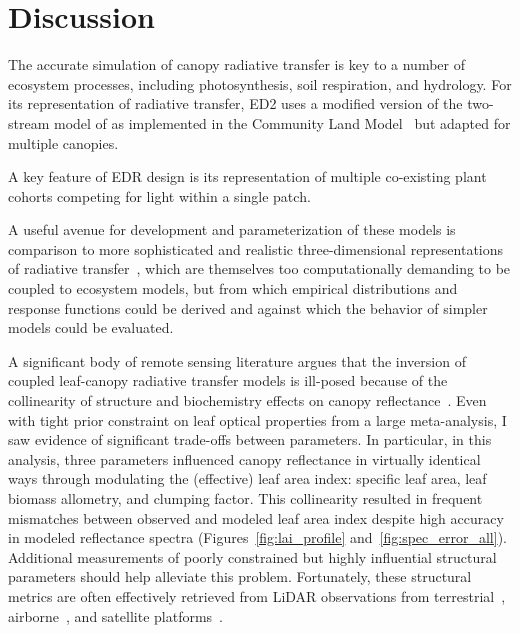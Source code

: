 \section{Discussion}

The accurate simulation of canopy radiative transfer is key to a number of ecosystem processes, including photosynthesis, soil respiration, and hydrology.
For its representation of radiative transfer, ED2 uses a modified version of the two-stream model of \citet{sellers1985canopy} as implemented in the Community Land Model~\citep{clm45_note} but adapted for multiple canopies.

A key feature of EDR design is its representation of multiple co-existing plant cohorts competing for light within a single patch.

A useful avenue for development and parameterization of these models is comparison to more sophisticated and realistic three-dimensional representations of radiative transfer~\citep[e.g.][]{widlowski2007third}, which are themselves too computationally demanding to be coupled to ecosystem models, but from which empirical distributions and response functions could be derived and against which the behavior of simpler models could be evaluated.

A significant body of remote sensing literature argues that the inversion of coupled leaf-canopy radiative transfer models is ill-posed because of the collinearity of structure and biochemistry effects on canopy reflectance~\citep[e.g.][]{combal2003retrieval, lewis2007spectral}.
Even with tight prior constraint on leaf optical properties from a large meta-analysis, I saw evidence of significant trade-offs between parameters.
In particular, in this analysis, three parameters influenced canopy reflectance in virtually identical ways through modulating the (effective) leaf area index:
specific leaf area, leaf biomass allometry, and clumping factor.
This collinearity resulted in frequent mismatches between observed and modeled leaf area index despite high accuracy in modeled reflectance spectra (Figures~\ref{fig:lai_profile} and~\ref{fig:spec_error_all}).
Additional measurements of poorly constrained but highly influential structural parameters should help alleviate this problem.
Fortunately, these structural metrics are often effectively retrieved from LiDAR observations from terrestrial~\citep{eitel_2016_beyond}, airborne~\citep{antonarakis2014imaging}, and satellite platforms~\citep{coyle_2015_laser}.

